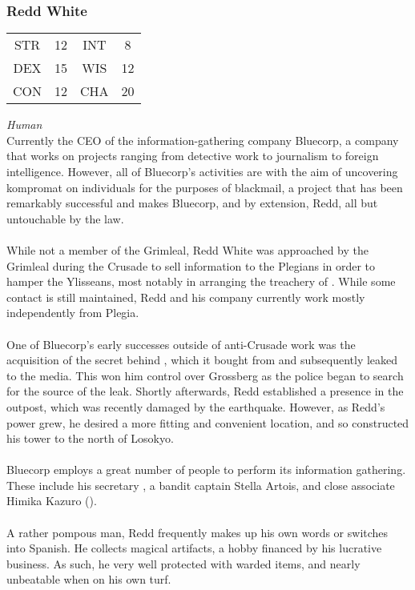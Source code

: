 \subsubsection{Redd White}
\label{people:redd}
\begin{center}
\begin{tabular}{c c|c c}
STR & 12 & INT & 8 \\
DEX & 15 & WIS & 12 \\
CON & 12 & CHA & 20 \end{tabular}\end{center}
\textit{Human}\\
Currently the CEO of the information-gathering company Bluecorp, a company that works on projects ranging from detective work to journalism to foreign intelligence. However, all of Bluecorp's activities are with the aim of uncovering kompromat on individuals for the purposes of blackmail, a project that has been remarkably successful and makes Bluecorp, and by extension, Redd, all but untouchable by the law. \\
\\
While not a member of the Grimleal, Redd White was approached by the Grimleal during the Crusade to sell information to the Plegians in order to hamper the Ylisseans, most notably in arranging the treachery of . While some contact is still maintained, Redd and his company currently work mostly independently from Plegia. \\
\\
One of Bluecorp's early successes outside of anti-Crusade work was the acquisition of the secret behind , which it bought from  and subsequently leaked to the media. This won him control over Grossberg as the police began to search for the source of the leak. Shortly afterwards, Redd established a presence in the  outpost, which was recently damaged by the earthquake. However, as Redd's power grew, he desired a more fitting and convenient location, and so constructed his tower to the north of Losokyo. \\
\\
Bluecorp employs a great number of people to perform its information gathering. These include his secretary , a bandit captain Stella Artois, and close associate Himika Kazuro (). \\
\\
A rather pompous man, Redd frequently makes up his own words or switches into Spanish. He collects magical artifacts, a hobby financed by his lucrative business. As such, he very well protected with warded items, and nearly unbeatable when on his own turf. 

